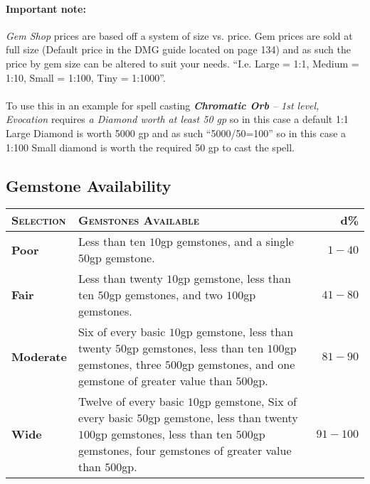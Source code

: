 \documentclass[a5paper,8pt]{book}
\begin{document}
\paragraph{Important note:}
\emph{Gem Shop} prices are based off a system of size vs. price. Gem prices are sold at full size (Default price in the DMG guide located on page 134) and as such the price by gem size can be altered to suit your needs. “I.e. Large = 1:1, Medium = 1:10, Small = 1:100, Tiny = 1:1000”.

\paragraph{}
To use this in an example for spell casting \emph{\textbf{Chromatic Orb} – 1st level, Evocation} requires \emph{a Diamond worth at least 50 gp} so in this case a default 1:1 Large Diamond is worth 5000 gp and as such “5000/50=100” so in this case a 1:100 Small diamond is worth the required 50 gp to cast the spell.


\subsection{Gemstone Availability}
\begin{tabularx}{\textwidth}{lXr}
    \hline
    \textbf{\textsc{Selection}} & \textbf{\textsc{Gemstones Available}} & \textbf{d\%}\\\hline
    \textbf{Poor} & Less than ten $10$gp gemstones, and a single $50$gp gemstone. & $1-40$\\
    \textbf{Fair} & Less than twenty $10$gp gemstone, less than ten $50$gp gemstones, and two $100$gp gemstones. & $41-80$\\
    \textbf{Moderate} & Six of every basic $10$gp gemstone, less than twenty $50$gp gemstones, less than ten $100$gp gemstones, three $500$gp gemstones, and one gemstone of greater value than $500$gp. & $81-90$\\
    \textbf{Wide} & Twelve of every basic $10$gp gemstone, Six of every basic $50$gp gemstone, less than twenty $100$gp gemstones, less than ten $500$gp gemstones, four gemstones of greater value than $500$gp. & $91-100$\\\hline
\end{tabularx}
\end{document}
